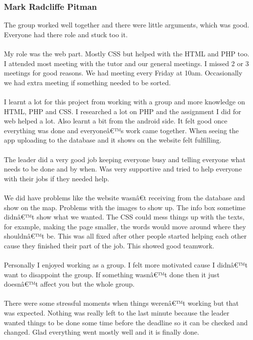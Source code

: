 \documentclass[12pt]{article}
\begin{document}
\subsubsection{Mark Radcliffe Pitman}
The group worked well together and there were little arguments, which was good. Everyone had there role and stuck too it. ~\\\\
My role was the web part. Mostly CSS but helped with the HTML and PHP too. I attended most meeting with the tutor and our general meetings. I missed 2 or 3 meetings for good reasons.  We had meeting every Friday at 10am. Occasionally we had extra meeting if something needed to be sorted. ~\\\\
I learnt a lot for this project from working with a group and more knowledge on HTML, PHP and CSS. I researched a lot on PHP and the assignment I did for web helped a lot. Also learnt a bit from the android side. It felt good once everything was done and everyoneâ€™s work came together. When seeing the app uploading to the database and it shows on the website felt fulfilling.  ~\\\\
The leader did a very good job keeping everyone busy and telling everyone what needs to be done and by when. Was very supportive and tried to help everyone with their jobs if they needed help.~\\\\
We did have problems like the website wasnâ€t receiving from the database and show on the map. Problems with the images to show up. The info box sometime didnâ€™t show what we wanted. The CSS could mess things up with the texts, for example, making the page smaller, the words would move around where they shouldnâ€™t be. This was all fixed after other people started helping each other cause they finished their part of the job. This showed good teamwork. ~\\\\
Personally I enjoyed working as a group. I felt more motivated cause I didnâ€™t want to disappoint the group. If something wasnâ€™t done then it just doesnâ€™t affect you but the whole group.~\\\\
 There were some stressful moments when things werenâ€™t working but that was expected. Nothing was really left to the last minute because the leader wanted things to be done some time before the deadline so it can be checked and changed. Glad everything went mostly well and it
is finally done.
\end{document}
